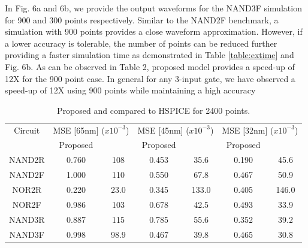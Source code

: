 In Fig. 6a and 6b, we provide the output waveforms for the NAND3F simulation for 900 and 300 points respectively. Similar to the NAND2F benchmark, a simulation with 900 points provides a close waveform approximation. However, if a lower accuracy is tolerable, the number of points can be reduced further providing a faster simulation time as demonstrated in Table \ref{table:extime} and Fig. 6b. As can be observed in Table 2, proposed model provides a speed-up of 12X for the 900 point case. In general for any 3-input gate, we have observed a speed-up of 12X using 900 points while maintaining a high accuracy

\begin{table}[!htbp]
	\begin{center}
		\caption{Proposed and \cite{Accurate_Masking} compared to HSPICE for 2400 points.}
		\label{table:pt}
		\begin{tabular}{|c|c|c|c|c|c|c|}
			\hline
			Circuit & \multicolumn{2}{c|}{MSE [65nm] ($x10^{-3}$)} & \multicolumn{2}{c|}{MSE [45nm] ($x10^{-3}$)} & \multicolumn{2}{c|}{MSE [32nm] ($x10^{-3}$)} \\ 
			\cline{2-7}
			& Proposed & \cite{Accurate_Masking} & Proposed & \cite{Accurate_Masking} & Proposed & \cite{Accurate_Masking}\\
			\hline
			NAND2R & 0.760 & 108 & 0.453 & 35.6 & 0.190 & 45.6 \\
			\hline
			NAND2F & 1.000 & 110 & 0.550 & 67.8 & 0.467 & 50.9 \\
			\hline
			NOR2R & 0.220 & 23.0 & 0.345 & 133.0 & 0.405 &146.0 \\
			\hline
			NOR2F & 0.986 & 103 & 0.678 & 42.5 & 0.493 & 33.9 \\
			\hline
			NAND3R & 0.887 & 115 & 0.785 & 55.6 & 0.352 & 39.2 \\
			\hline
			NAND3F & 0.998 & 98.9 & 0.467 & 39.8 & 0.465 & 30.8 \\
			\hline
		\end{tabular}
	\end{center}
\end{table}


